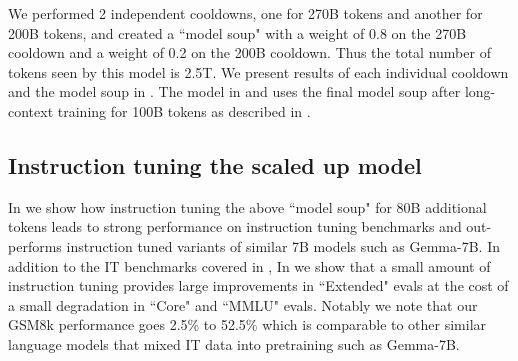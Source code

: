 \documentclass{article}
\begin{document}
We performed 2 independent cooldowns, one for 270B tokens and another for 200B tokens, and created a ``model soup" \citep{wortsman2022model} with a weight of 0.8 on the 270B cooldown and a weight of 0.2 on the 200B cooldown. Thus the total number of tokens seen by this model is 2.5T. We present results of each individual cooldown and the model soup in . The model in  and  uses the final model soup after long-context training for 100B tokens as described in .

\subsection{Instruction tuning the scaled up model}
In  we show how instruction tuning the above ``model soup" for 80B additional tokens leads to strong performance on instruction tuning benchmarks and out-performs instruction tuned variants of similar 7B models such as Gemma-7B. In addition to the IT benchmarks covered in , In  we show that a small amount of instruction tuning provides large improvements in ``Extended" evals at the cost of a small degradation in ``Core" and ``MMLU" evals. Notably we note that our GSM8k performance goes 2.5\% to 52.5\% which is comparable to other similar language models that mixed IT data into pretraining such as Gemma-7B.



\end{document}
